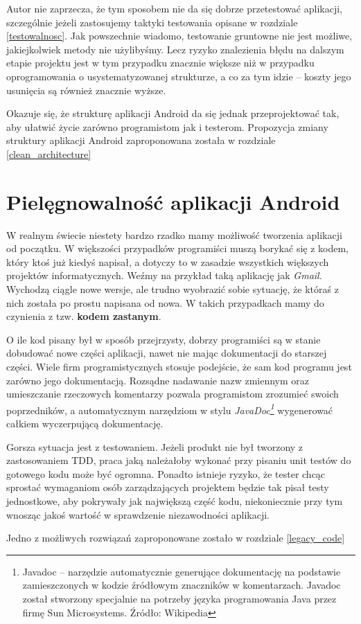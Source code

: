 Autor nie zaprzecza, że tym sposobem nie da się dobrze przetestować aplikacji, szczególnie jeżeli zastosujemy taktyki testowania opisane w rozdziale \ref{testowalnosc}. Jak powszechnie wiadomo, testowanie gruntowne nie jest możliwe, jakiejkolwiek metody nie użylibyśmy. Lecz ryzyko znalezienia błędu na dalszym etapie projektu jest w tym przypadku znacznie większe niż w przypadku oprogramowania o usystematyzowanej strukturze, a co za tym idzie – koszty jego usunięcia są również znacznie wyższe.

Okazuje się, że strukturę aplikacji Android da się jednak przeprojektować tak, aby ułatwić życie zarówno programistom jak i testerom. Propozycja zmiany struktury aplikacji Android zaproponowana została w rozdziale \ref{clean_architecture}

\section{Pielęgnowalność aplikacji Android}
\label{pielegnowalnosc_aplikacji}
W realnym świecie niestety bardzo rzadko mamy możliwość tworzenia aplikacji od początku. W większości przypadków programiści muszą borykać się z kodem, który ktoś już kiedyś napisał, a dotyczy to w zasadzie wszystkich większych projektów informatycznych. Weźmy na przykład taką aplikację jak \textit{Gmail}. Wychodzą ciągle nowe wersje, ale trudno wyobrazić sobie sytuację, że któraś z nich została po prostu napisana od nowa. W takich przypadkach mamy do czynienia z tzw. \textbf{kodem zastanym}.

O ile kod pisany był w sposób przejrzysty, dobrzy programiści są w stanie dobudować nowe części aplikacji, nawet nie mając dokumentacji do starszej części. Wiele firm programistycznych stosuje podejście, że sam kod programu jest zarówno jego dokumentacją. Rozsądne nadawanie nazw zmiennym oraz umieszczanie rzeczowych komentarzy pozwala programistom zrozumieć swoich poprzedników, a automatycznym narzędziom w stylu \textit{JavaDoc\footnote{Javadoc – narzędzie automatycznie generujące dokumentację na podstawie zamieszczonych w kodzie źródłowym znaczników w komentarzach. Javadoc został stworzony specjalnie na potrzeby języka programowania Java przez firmę Sun Microsystems. Źródło: Wikipedia}} wygenerować całkiem wyczerpującą dokumentację.

Gorsza sytuacja jest z testowaniem. Jeżeli produkt nie był tworzony z zastosowaniem TDD, praca jaką należałoby wykonać przy pisaniu unit testów do gotowego kodu może być ogromna. Ponadto istnieje ryzyko, że tester chcąc sprostać wymaganiom osób zarządzających projektem będzie tak pisał testy jednostkowe, aby pokrywały jak największą część kodu, niekoniecznie przy tym wnosząc jakoś wartość w sprawdzenie niezawodności aplikacji.

Jedno z możliwych rozwiązań zaproponowane zostało w rozdziale \ref{legacy_code}